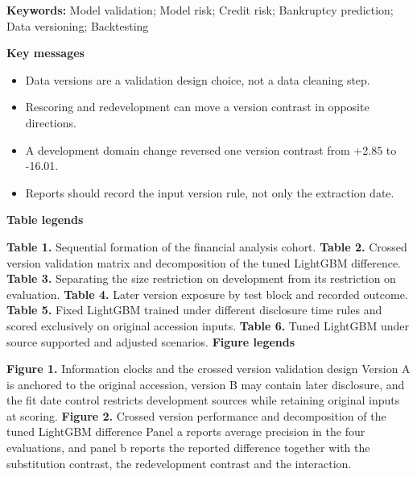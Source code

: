 \documentclass[10pt,a4paper,twocolumn]{article}
\begin{document}
\par\vspace{4pt}\noindent\textbf{Keywords:} Model validation; Model risk; Credit risk; Bankruptcy prediction; Data versioning; Backtesting\par
\vspace{4pt}\noindent\textbf{Key messages}\par\vspace{2pt}
\begin{itemize}[leftmargin=*,itemsep=1pt,topsep=2pt]
\item Data versions are a validation design choice, not a data cleaning step.
\item Rescoring and redevelopment can move a version contrast in opposite directions.
\item A development domain change reversed one version contrast from +2.85 to -16.01.
\item Reports should record the input version rule, not only the extraction date.
\end{itemize}
\vspace{6pt}\noindent\textbf{Table legends}\par\vspace{2pt}
\noindent\textbf{Table 1.} Sequential formation of the financial analysis cohort.
\noindent\textbf{Table 2.} Crossed version validation matrix and decomposition of the tuned LightGBM difference.
\noindent\textbf{Table 3.} Separating the size restriction on development from its restriction on evaluation.
\noindent\textbf{Table 4.} Later version exposure by test block and recorded outcome.
\noindent\textbf{Table 5.} Fixed LightGBM trained under different disclosure time rules and scored exclusively on original accession inputs.
\noindent\textbf{Table 6.} Tuned LightGBM under source supported and adjusted scenarios.
\vspace{6pt}\noindent\textbf{Figure legends}\par\vspace{2pt}
\noindent\textbf{Figure 1.} Information clocks and the crossed version validation design Version A is anchored to the original accession, version B may contain later disclosure, and the fit date control restricts development sources while retaining original inputs at scoring.
\noindent\textbf{Figure 2.} Crossed version performance and decomposition of the tuned LightGBM difference Panel a reports average precision in the four evaluations, and panel b reports the reported difference together with the substitution contrast, the redevelopment contrast and the interaction.
\end{document}
